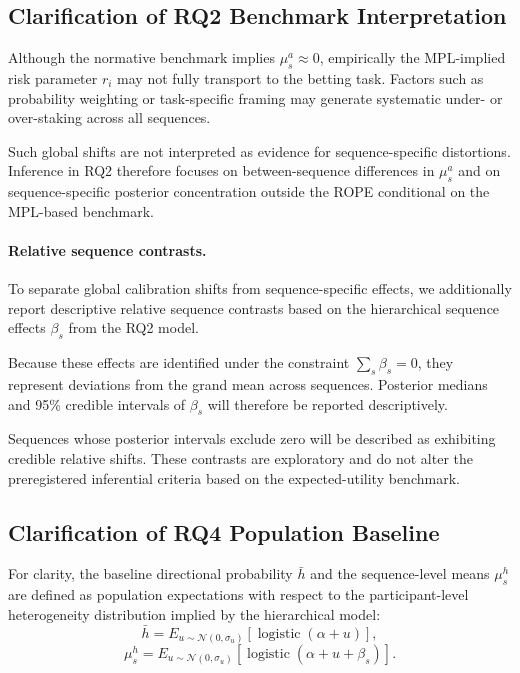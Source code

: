 \documentclass[11pt,a4paper]{article}
\numberwithin{equation}{section}
\begin{document}
\subsection{Clarification of RQ2 Benchmark Interpretation}

Although the normative benchmark implies
$\mu_s^{a} \approx 0$, empirically the MPL-implied risk parameter $r_i$
may not fully transport to the betting task. Factors such as probability
weighting or task-specific framing may generate systematic under- or
over-staking across all sequences.

Such global shifts are not interpreted as evidence for sequence-specific
distortions. Inference in RQ2 therefore focuses on between-sequence
differences in $\mu_s^{a}$ and on sequence-specific posterior
concentration outside the ROPE conditional on the MPL-based benchmark.

\paragraph{Relative sequence contrasts.}

To separate global calibration shifts from sequence-specific effects,
we additionally report descriptive relative sequence contrasts based on
the hierarchical sequence effects $\beta_s$ from the RQ2 model.

Because these effects are identified under the constraint
$\sum_s \beta_s = 0$, they represent deviations from the grand mean
across sequences. Posterior medians and 95\% credible intervals of
$\beta_s$ will therefore be reported descriptively.

Sequences whose posterior intervals exclude zero will be described
as exhibiting credible relative shifts. These contrasts are exploratory
and do not alter the preregistered inferential criteria based on the
expected-utility benchmark.

\subsection{Clarification of RQ4 Population Baseline}

For clarity, the baseline directional probability $\bar{h}$ and the
sequence-level means $\mu_s^{h}$ are defined as population expectations
with respect to the participant-level heterogeneity distribution implied
by the hierarchical model:
\[
\bar{h} =
E_{u \sim \mathcal N(0,\sigma_u)}
\!\left[\operatorname{logistic}(\alpha + u)\right],
\]
\[
\mu_s^{h} =
E_{u \sim \mathcal N(0,\sigma_u)}
\!\left[\operatorname{logistic}(\alpha + u + \beta_s)\right].
\]
\end{document}
